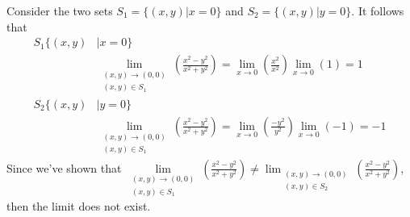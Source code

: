\documentclass{article}
\begin{document}
\begin{enumerate}[start=1,label={\bfseries Theorem \arabic*:}, wide=0pt]
Consider the two sets $S_1=\{ (x,y) \rvert x=0 \}$ and $S_2=\{ (x,y) \rvert y=0 \}$. It follows that 
\begin{align*}
S_1\{(x,y)&{}\lvert x=0\} \\
          &{} \lim_{\substack{(x,y) \to (0,0) \\ (x,y) \in S_1}} \left(\frac{x^2-y^2}{x^2+y^2}\right) =\lim_{x \rightarrow{0}} \left( \frac{x^2}{x^2} \right) \lim_{x\rightarrow{}0}(1)=1 \\[1.5ex]
S_2 \{(x,y) &{} \lvert y=0\} \\
&{} \lim_{\substack{(x,y) \to (0,0) \\ (x,y) \in S_1}} \left(\frac{x^2-y^2}{x^2+y^2}\right) =\lim_{x \rightarrow{0}} \left( \frac{-y^2}{y^2} \right) \lim_{x\rightarrow{0}}(-1) = -1 
\end{align*}
Since we've shown that $\lim\limits_{\substack{(x,y) \to (0,0) \\ (x,y) \in S_1}} \left(\frac{x^2-y^2}{x^2+y^2}\right) \neq \lim_{\substack{(x,y) \to (0,0) \\ (x,y) \in S_2}} \left(\frac{x^2-y^2}{x^2+y^2}\right)$, then the limit does not exist.


\end{enumerate}

\newpage
\end{document}
